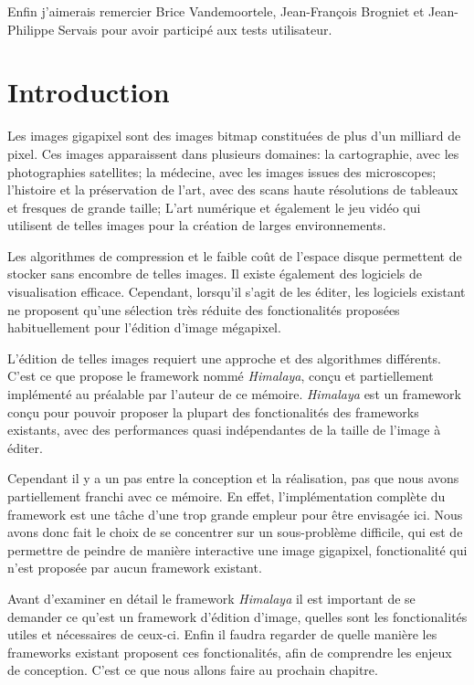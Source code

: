 	Enfin j'aimerais remercier Brice Vandemoortele, Jean-François Brogniet et Jean-Philippe Servais pour avoir participé aux tests utilisateur.

\chapter{Introduction}
	Les images gigapixel sont des images bitmap constituées de plus d'un milliard de pixel. Ces images apparaissent dans plusieurs domaines: la cartographie,
	avec les photographies satellites; la médecine, avec les images issues des microscopes; l'histoire et la préservation de l'art, avec des scans haute 
	résolutions de tableaux et fresques de grande taille; L'art numérique et également le jeu vidéo qui utilisent de telles images pour la création
	de larges environnements. 

	Les algorithmes de compression et le faible coût de l'espace disque permettent de stocker sans encombre de telles images. Il existe également des logiciels
	de visualisation efficace. Cependant, lorsqu'il s'agit de les éditer, les logiciels existant ne proposent qu'une sélection très réduite des fonctionalités
	proposées habituellement pour l'édition d'image mégapixel.  

	L'édition de telles images requiert une approche et des algorithmes différents. C'est ce que propose le framework nommé \emph{Himalaya}, conçu et
	partiellement implémenté au préalable par l'auteur de ce mémoire.  \emph{Himalaya} est un framework conçu pour pouvoir proposer la plupart des
	fonctionalités des frameworks existants, avec des performances quasi indépendantes de la taille de l'image à éditer. 

	Cependant il y a un pas entre la conception et la réalisation, pas que nous avons partiellement franchi avec ce mémoire. En effet, l'implémentation
	complète du framework est une tâche d'une trop grande empleur pour être envisagée ici. Nous avons donc fait le choix de se concentrer sur un
	sous-problème difficile, qui est de permettre de peindre de manière interactive une image gigapixel, fonctionalité qui n'est proposée par aucun
	framework existant.

	Avant d'examiner en détail le framework \emph{Himalaya} il est important de se demander ce qu'est un framework d'édition d'image, quelles sont les
	fonctionalités utiles et nécessaires de ceux-ci. Enfin il faudra regarder de quelle manière les frameworks existant proposent ces fonctionalités,
	afin de comprendre les enjeux de conception. C'est ce que nous allons faire au prochain chapitre. 
	
